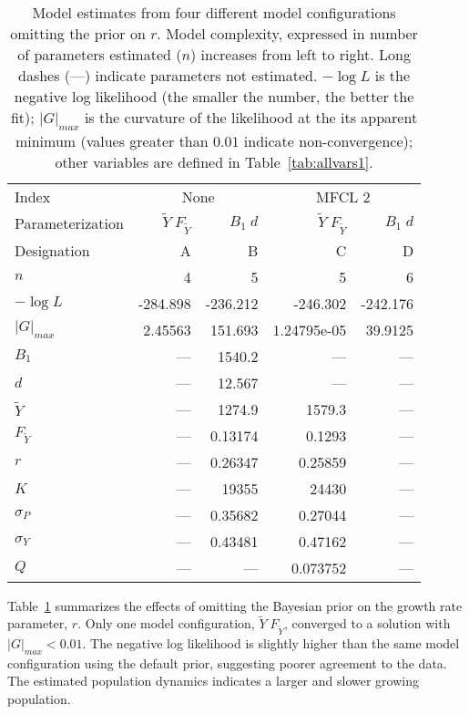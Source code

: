 \documentclass[12pt,letterpaper,twoside]{article}
\newcommand\MSY{\widetilde{Y}}
\newcommand\Fmsy{F_{\MSY}}
\newcommand\MSYFmsy{\MSY\;\Fmsy}
\newcommand\Bd{B_1\; d}
\begin{document}
\begin{table}[h]
\caption{
Model estimates from four different model configurations omitting the
prior on $r$.
Model complexity, expressed in number of parameters estimated ($n$)
increases from left to right. Long dashes (---) indicate parameters
not estimated. 
{%
$-\log L$ is the negative log likelihood (the smaller the number, the
better the fit);
$|G|_{max}$ is the curvature of the likelihood at the its apparent
minimum (values greater than $0.01$ indicate non-convergence);
other variables are defined in Table~\ref{tab:allvars1}.
}
\label{tag:ests4NOprior}}
\begin{center}
\begin{tabular}{|l|rr|rr|}
\hline
Index & \multicolumn{2}{c|}{None}&\multicolumn{2}{c|}{MFCL 2}\\
\cline{2-3}\cline{4-5}
Parameterization&$\MSYFmsy$&$\Bd$&$\MSYFmsy$&$\Bd$\\
Designation& A & B& C& D\\
\hline

\hline
$n$ & 4 & 5 & 5 & 6\\
$-\log L$ & -284.898 & -236.212 & -246.302 & -242.176\\
$|G|_{max}$ & 2.45563 & 151.693 & 1.24795e-05 & 39.9125\\
\hline
$B_1$ & --- & 1540.2 & --- & ---\\
$d$ & --- & 12.567 & --- & ---\\
$\MSY$ & --- & 1274.9 & 1579.3 & ---\\
$\Fmsy$ & --- & 0.13174 & 0.1293 & ---\\
$r$ & --- & 0.26347 & 0.25859 & ---\\
$K$ & --- & 19355 & 24430 & ---\\
$\sigma_P$ & --- & 0.35682 & 0.27044 & ---\\
$\sigma_Y$ & --- & 0.43481 & 0.47162 & ---\\
$Q$ & --- & --- & 0.073752 & ---\\
\hline
\end{tabular}
\end{center}
\end{table}

Table~\ref{tag:ests4NOprior} summarizes the effects of omitting the
Bayesian prior on the growth rate parameter, $r$. Only one model
configuration, $\MSYFmsy$, converged to a solution with
$|G|_{max}<0.01$. The negative
log likelihood is slightly higher than the same model configuration
using the default prior, suggesting poorer agreement to the data. The
estimated population dynamics indicates a larger and slower growing
population.
\end{document}
